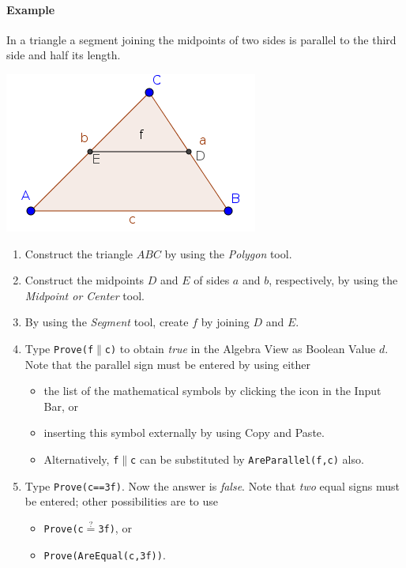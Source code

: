 \documentclass{article}
\begin{document}
\paragraph{Example}
In a triangle a segment joining the midpoints of two sides
is parallel to the third side and half its length.
\begin{center}
\includegraphics[scale=0.5]{Prove-example}
\end{center}
\begin{enumerate}
\item Construct the triangle $ABC$ by using the \textit{Polygon} tool.
\item Construct the midpoints $D$ and $E$ of sides $a$ and $b$, respectively, by using the \textit{Midpoint or Center} tool.
\item By using the \textit{Segment} tool, create $f$ by joining $D$ and $E$.
\item Type \texttt{Prove(f$\parallel$c)} to obtain \textit{true} in the Algebra View as Boolean Value $d$. Note that the parallel sign must be entered by using either
\begin{itemize}
\item the list of the mathematical symbols by clicking the \framebox{$\alpha$} icon in the Input Bar, or
\item inserting this symbol externally by using Copy and Paste.
\item Alternatively, \texttt{f$\parallel$c} can be substituted by \texttt{AreParallel(f,c)} also.
\end{itemize}

\item Type \texttt{Prove(c==3f)}. Now the answer is \textit{false}. Note that \textit{two} equal signs must be entered; other possibilities are to use
\begin{itemize}
    \item \texttt{Prove(c$\stackrel{?}{=}$3f)}, or
    \item \texttt{Prove(AreEqual(c,3f))}.
\end{itemize}

\end{enumerate}
\end{document}
